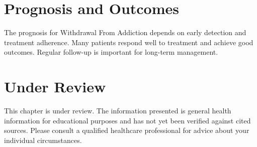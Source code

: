 \section*{Prognosis and Outcomes}
The prognosis for Withdrawal From Addiction depends on early detection and treatment adherence. Many patients respond well to treatment and achieve good outcomes. Regular follow-up is important for long-term management.
\section*{Under Review}
This chapter is under review. The information presented is general health information for educational purposes and has not yet been verified against cited sources. Please consult a qualified healthcare professional for advice about your individual circumstances.


\clearpage
